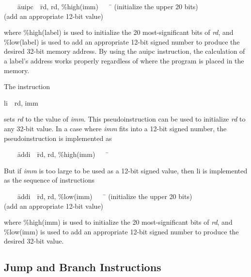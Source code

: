 \documentclass[11pt, twoside, pdftex]{article}
\newenvironment{ctabbing}%
{\begin{center}\begin{minipage}{\textwidth}\begin{tabbing}}
{\end{tabbing}\end{minipage}\end{center}}
\begin{document}
\begin{ctabbing}
~~~~\={\sf auipc}~~\={\sf rd, rd, \%high(imm)}~~~~\=\kill
{}  \>(initialize the upper 20 bits)\\
  \>(add an appropriate 12-bit value)\\
\end{ctabbing}
\vspace{-\baselineskip}
where {\sf \%high(label)} is used to initialize the 20 most-significant bits of {\it rd}, and 
{\sf \%low(label)} is used to add an appropriate 12-bit signed number to produce the desired 
32-bit memory address. By using the {\sf auipc} instruction, the calculation of a label's
address works properly regardless of where the program is placed in the memory.

\noindent
The instruction
\vspace{-\baselineskip}
\begin{center}
{\sf li~~rd, imm}
\end{center}
\noindent
sets {\it rd} to the value of {\it imm}. This pseudoinstruction can be used to initialize
{\it rd} to any 32-bit value. In a case where {\it imm} fits into a 12-bit signed number, 
the pseudoinstruction is implemented as
\begin{ctabbing}
~~~~\={\sf addi}~~\={\sf rd, rd, \%high(imm)}~~~~\=\kill
{}
\end{ctabbing}
\vspace{-\baselineskip}
But if {\it imm} is too large to be used as a 12-bit signed value, then
{\sf li} is implemented as the sequence of instructions
\begin{ctabbing}
~~~~\={\sf addi}~~\={\sf rd, rd, \%low(imm)}~~~~\=\kill
{}  \>(initialize the upper 20 bits)\\
  \>(add an appropriate 12-bit value)\\
\end{ctabbing}
\vspace{-\baselineskip}
where {\sf \%high(imm)} is used to initialize the 20 most-significant bits of {\it rd}, and 
{\sf \%low(imm)} is used to add an appropriate 12-bit signed number to produce the desired 
32-bit value.

\subsection{Jump and Branch Instructions}
\label{sec:flow}
\end{document}

